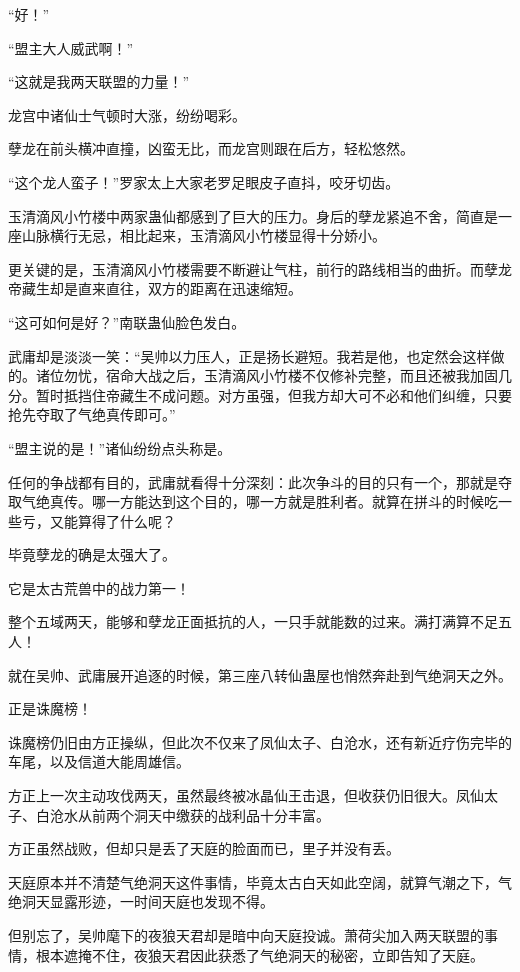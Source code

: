 
\begin{this_body}

“好！”

“盟主大人威武啊！”

“这就是我两天联盟的力量！”

龙宫中诸仙士气顿时大涨，纷纷喝彩。

孽龙在前头横冲直撞，凶蛮无比，而龙宫则跟在后方，轻松悠然。

“这个龙人蛮子！”罗家太上大家老罗足眼皮子直抖，咬牙切齿。

玉清滴风小竹楼中两家蛊仙都感到了巨大的压力。身后的孽龙紧追不舍，简直是一座山脉横行无忌，相比起来，玉清滴风小竹楼显得十分娇小。

更关键的是，玉清滴风小竹楼需要不断避让气柱，前行的路线相当的曲折。而孽龙帝藏生却是直来直往，双方的距离在迅速缩短。

“这可如何是好？”南联蛊仙脸色发白。

武庸却是淡淡一笑：“吴帅以力压人，正是扬长避短。我若是他，也定然会这样做的。诸位勿忧，宿命大战之后，玉清滴风小竹楼不仅修补完整，而且还被我加固几分。暂时抵挡住帝藏生不成问题。对方虽强，但我方却大可不必和他们纠缠，只要抢先夺取了气绝真传即可。”

“盟主说的是！”诸仙纷纷点头称是。

任何的争战都有目的，武庸就看得十分深刻：此次争斗的目的只有一个，那就是夺取气绝真传。哪一方能达到这个目的，哪一方就是胜利者。就算在拼斗的时候吃一些亏，又能算得了什么呢？

毕竟孽龙的确是太强大了。

它是太古荒兽中的战力第一！

整个五域两天，能够和孽龙正面抵抗的人，一只手就能数的过来。满打满算不足五人！

就在吴帅、武庸展开追逐的时候，第三座八转仙蛊屋也悄然奔赴到气绝洞天之外。

正是诛魔榜！

诛魔榜仍旧由方正操纵，但此次不仅来了凤仙太子、白沧水，还有新近疗伤完毕的车尾，以及信道大能周雄信。

方正上一次主动攻伐两天，虽然最终被冰晶仙王击退，但收获仍旧很大。凤仙太子、白沧水从前两个洞天中缴获的战利品十分丰富。

方正虽然战败，但却只是丢了天庭的脸面而已，里子并没有丢。

天庭原本并不清楚气绝洞天这件事情，毕竟太古白天如此空阔，就算气潮之下，气绝洞天显露形迹，一时间天庭也发现不得。

但别忘了，吴帅麾下的夜狼天君却是暗中向天庭投诚。萧荷尖加入两天联盟的事情，根本遮掩不住，夜狼天君因此获悉了气绝洞天的秘密，立即告知了天庭。


\end{this_body}
